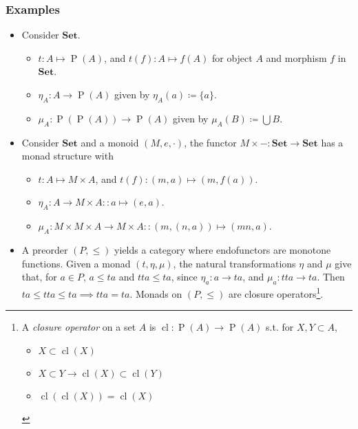 \documentclass[UTF8,aspectratio=43,11pt,colorlinks,compress,openany]{beamer}%
\begin{document}
\begin{frame}\frametitle{Examples}
\begin{itemize}
	\item Consider $\mathbf{Set}$.
	\begin{itemize}
 		\item $t: A\mapsto \operatorname{P}(A)$, and $t(f): A\mapsto f(A)$ for object $A$ and morphism $f$ in $\mathbf{Set}$.
 		\item $\eta_A: A\to \operatorname{P}(A)$ given by $\eta_A(a)\coloneqq \{a\}$.
 		\item $\mu_A: \operatorname{P}(\operatorname{P}(A))\to \operatorname{P}(A)$ given by $\mu_A(B)\coloneqq \bigcup B$.
	\end{itemize}
	\item Consider $\mathbf{Set}$ and a monoid $(M,e,\cdot)$, the functor $M\times -:\mathbf{Set}\to\mathbf{Set}$ has a monad structure with
	\begin{itemize}
		\item $t: A\mapsto M\times A$, and $t(f): (m,a)\mapsto (m,f(a))$.
		\item $\eta_A: A\to M\times A :: a\mapsto (e,a)$.
		\item $\mu_A: M\times M\times A\to M\times A :: (m,(n,a))\mapsto (mn,a)$.
	\end{itemize}
	\item A preorder $(P,\leq)$ yields a category where endofunctors are monotone functions. Given a monad $(t,\eta,\mu)$, the natural transformations $\eta$ and $\mu$ give that, for $a\in P$, $a\leq ta$ and $tta\leq ta$, since $\eta_a: a\to ta$, and $\mu_a: tta\to ta$. Then $ta\leq tta\leq ta\implies tta=ta$. Monads on $(P,\leq)$ are closure operators\footnote{A \emph{closure operator} on a set $A$ is $\operatorname{cl}: \operatorname{P}(A)\to \operatorname{P}(A)$ s.t. for $X,Y\subset A$,
\begin{itemize}
	\item $X\subset \operatorname{cl}(X)$
	\item $X\subset Y\to \operatorname{cl}(X)\subset \operatorname{cl}(Y)$
	\item $\operatorname{cl}(\operatorname{cl}(X))=\operatorname{cl}(X)$
\end{itemize}}.
\end{itemize}
\end{frame}
\end{document}
